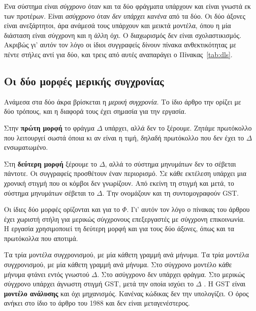 Ένα σύστημα είναι \emph{σύγχρονο} όταν και τα δύο φράγματα υπάρχουν και
είναι γνωστά εκ των προτέρων. Είναι \emph{ασύγχρονο} όταν \emph{δεν
υπάρχει κανένα} από τα δύο. Οι δύο άξονες είναι ανεξάρτητοι, άρα
ανάμεσά τους υπάρχουν και μεικτά μοντέλα, όπου η μία διάσταση είναι
σύγχρονη και η άλλη όχι. Ο διαχωρισμός δεν είναι σχολαστικισμός.
Ακριβώς γι' αυτόν τον λόγο οι ίδιοι συγγραφείς δίνουν πίνακα
ανθεκτικότητας με πέντε στήλες αντί για δύο, και τρεις από αυτές
αναπαράγει ο Πίνακας~\ref{tab:dls}.

\subsection{Οι δύο μορφές μερικής συγχρονίας}

Ανάμεσα στα δύο άκρα βρίσκεται η \emph{μερική συγχρονία}. Το ίδιο άρθρο
την ορίζει με δύο τρόπους, και η διαφορά τους έχει σημασία για την
εργασία.

Στην \textbf{πρώτη μορφή} το φράγμα $\Delta$ υπάρχει, αλλά δεν το
ξέρουμε. Ζητάμε πρωτόκολλο που λειτουργεί σωστά όποια κι αν είναι η
τιμή, δηλαδή πρωτόκολλο που δεν έχει το $\Delta$ ενσωματωμένο.

Στη \textbf{δεύτερη μορφή} ξέρουμε το $\Delta$, αλλά το σύστημα
μηνυμάτων δεν το σέβεται πάντοτε. Οι συγγραφείς προσθέτουν έναν
περιορισμό. Σε κάθε εκτέλεση υπάρχει μια χρονική στιγμή που οι κόμβοι
δεν γνωρίζουν. Από εκείνη τη στιγμή και μετά, το σύστημα μηνυμάτων
σέβεται το $\Delta$. Την ονομάζουν  και τη
συντομογραφούν GST.

Οι ίδιες δύο μορφές ορίζονται και για το $\Phi$. Γι' αυτόν τον λόγο ο
πίνακας του άρθρου έχει χωριστή στήλη για μερικώς σύγχρονους
επεξεργαστές με σύγχρονη επικοινωνία. Η εργασία χρησιμοποιεί τη δεύτερη
μορφή και για τους δύο άξονες, όπως και τα πρωτόκολλα που αποτιμά.

%
{Τα τρία μοντέλα συγχρονισμού, με μία κάθετη γραμμή ανά μήνυμα.}%
{Τα τρία μοντέλα συγχρονισμού, με μία κάθετη γραμμή ανά μήνυμα. Στο
σύγχρονο μοντέλο κάθε μήνυμα φτάνει εντός γνωστού $\Delta$. Στο
ασύγχρονο δεν υπάρχει φράγμα. Στο μερικώς σύγχρονο υπάρχει άγνωστη
στιγμή GST, μετά την οποία ισχύει το $\Delta$ \cite{dwork1988consensus}.
Η GST είναι \textbf{μοντέλο ανάλυσης} και όχι μηχανισμός. Κανένας
κώδικας δεν την υπολογίζει. Ο όρος ανήκει στο ίδιο το άρθρο του 1988 και
δεν είναι μεταγενέστερος.}%
{}

